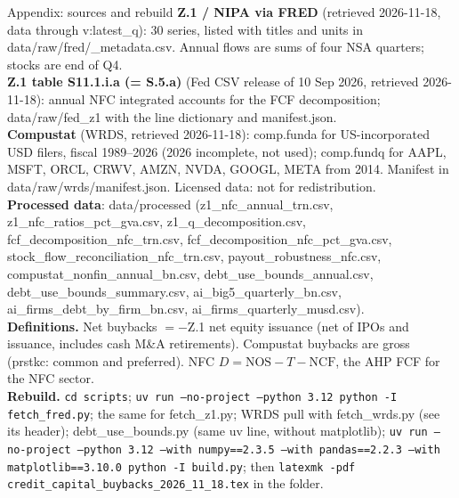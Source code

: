\documentclass[aspectratio=169,10pt,t]{beamer}
\newcommand{\val}[1]{\csname v:#1\endcsname}
\begin{document}
\begin{frame}{Appendix: sources and rebuild}
\vspace{0.1cm}
{\scriptsize
\textbf{Z.1 / NIPA via FRED} (retrieved 2026-11-18, data through \val{latest_q}): 30 series, listed with titles and units in data/raw/fred/\_metadata.csv. Annual flows are sums of four NSA quarters; stocks are end of Q4.\\[0.12cm]
\textbf{Z.1 table S11.1.i.a (= S.5.a)} (Fed CSV release of 10 Sep 2026, retrieved 2026-11-18): annual NFC integrated accounts for the FCF decomposition; data/raw/fed\_z1 with the line dictionary and manifest.json.\\[0.12cm]
\textbf{Compustat} (WRDS, retrieved 2026-11-18): comp.funda for US-incorporated USD filers, fiscal 1989--2026 (2026 incomplete, not used); comp.fundq for AAPL, MSFT, ORCL, CRWV, AMZN, NVDA, GOOGL, META from 2014. Manifest in data/raw/wrds/manifest.json. Licensed data: not for redistribution.\\[0.12cm]
\textbf{Processed data}: data/processed (z1\_nfc\_annual\_trn.csv, z1\_nfc\_ratios\_pct\_gva.csv, z1\_q\_decomposition.csv, fcf\_decomposition\_nfc\_trn.csv, fcf\_decomposition\_nfc\_pct\_gva.csv, stock\_flow\_reconciliation\_nfc\_trn.csv, payout\_robustness\_nfc.csv, compustat\_nonfin\_annual\_bn.csv, debt\_use\_bounds\_annual.csv, debt\_use\_bounds\_summary.csv, ai\_big5\_quarterly\_bn.csv, ai\_firms\_debt\_by\_firm\_bn.csv, ai\_firms\_quarterly\_musd.csv).\\[0.12cm]
\textbf{Definitions.} Net buybacks $=-$Z.1 net equity issuance (net of IPOs and issuance, includes cash M\&A retirements). Compustat buybacks are gross (prstkc: common and preferred). NFC $D=\mathrm{NOS}-T-\mathrm{NCF}$, the AHP FCF for the NFC sector.\\[0.12cm]
\textbf{Rebuild.} \texttt{cd scripts}; \texttt{uv run --no-project --python 3.12 python -I fetch\_fred.py}; the same for fetch\_z1.py; WRDS pull with fetch\_wrds.py (see its header); debt\_use\_bounds.py (same uv line, without matplotlib); \texttt{uv run --no-project --python 3.12 --with numpy==2.3.5 --with pandas==2.2.3 --with matplotlib==3.10.0 python -I build.py}; then \texttt{latexmk -pdf credit\_capital\_buybacks\_2026\_11\_18.tex} in the folder.}
\end{frame}
\end{document}
